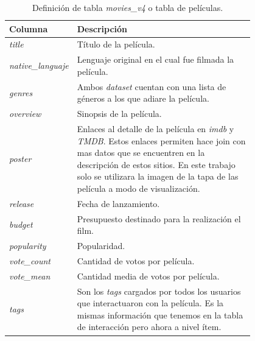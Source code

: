 \documentclass[11pt,a4paper,twoside]{thesis}
\begin{document}
\begin{table}[!htb]
	\centering
	\footnotesize
	\begin{tabular}{l | p{0.8\linewidth}}
		\hline
		Columna                   & Descripción                                                                              \\
		\hline

		\textit{title}            & Título de la película.                                                                   \\
		\textit{native\_languaje} & Lenguaje original en el cual fue filmada la película.                                    \\
		\textit{genres}           & Ambos \textit{dataset} cuentan con una lista de géneros a los que adiare la película.    \\
		\textit{overview}         & Sinopsis de la película.                                                                 \\
		\textit{poster}           & Enlaces al detalle de la película en \textit{imdb} y \textit{TMDB}. Estos enlaces
		permiten hace join con mas datos que se encuentren en la descripción de estos
		sitios. En este trabajo solo se utilizara la imagen de la tapa de las película
		a modo de visualización.                                                                                             \\
		\textit{release}          & Fecha de lanzamiento.                                                                    \\
		\textit{budget}           & Presupuesto destinado para la realización el film.                                       \\
		\textit{popularity}       & Popularidad.                                                                             \\
		\textit{vote\_count}      & Cantidad de votos por película.                                                          \\
		\textit{vote\_mean}       & Cantidad media de votos por película.                                                    \\
		\textit{tags}             & Son los \textit{tags} cargados por todos los usuarios que interactuaron con la película.
		Es la mismas información que tenemos en la tabla de interacción pero ahora a nivel ítem.                             \\

		\hline
	\end{tabular}
	\caption{
		Definición de tabla \textit{movies\_v4} o tabla de películas.
	}
	\label{table:moviesTableDef}
\end{table}
\end{document}
